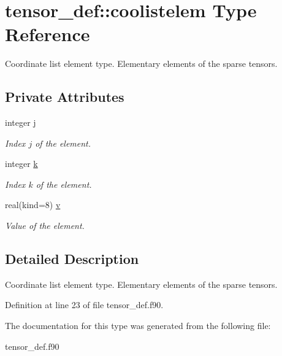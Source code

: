 \hypertarget{structtensor__def_1_1coolistelem}{}\section{tensor\+\_\+def\+:\+:coolistelem Type Reference}
\label{structtensor__def_1_1coolistelem}


Coordinate list element type. Elementary elements of the sparse tensors.  


\subsection*{Private Attributes}
\begin{DoxyCompactItemize}
\item 
\mbox{\label{structtensor__def_1_1coolistelem_a72243a3a466371a2d71ba4a9da505a34}} 
integer \hyperlink{structtensor__def_1_1coolistelem_a72243a3a466371a2d71ba4a9da505a34}{j}
\begin{DoxyCompactList}\small\item\em Index $j$ of the element. \end{DoxyCompactList}\item 
\mbox{\label{structtensor__def_1_1coolistelem_a644211f265e9a4fc712f3bc7d1362712}} 
integer \hyperlink{structtensor__def_1_1coolistelem_a644211f265e9a4fc712f3bc7d1362712}{k}
\begin{DoxyCompactList}\small\item\em Index $k$ of the element. \end{DoxyCompactList}\item 
\mbox{\label{structtensor__def_1_1coolistelem_a67b9432a8f7621a51129b48e3749bdf0}} 
real(kind=8) \hyperlink{structtensor__def_1_1coolistelem_a67b9432a8f7621a51129b48e3749bdf0}{v}
\begin{DoxyCompactList}\small\item\em Value of the element. \end{DoxyCompactList}\end{DoxyCompactItemize}


\subsection{Detailed Description}
Coordinate list element type. Elementary elements of the sparse tensors. 

Definition at line 23 of file tensor\+\_\+def.\+f90.



The documentation for this type was generated from the following file\+:\begin{DoxyCompactItemize}
\item 
tensor\+\_\+def.\+f90\end{DoxyCompactItemize}

